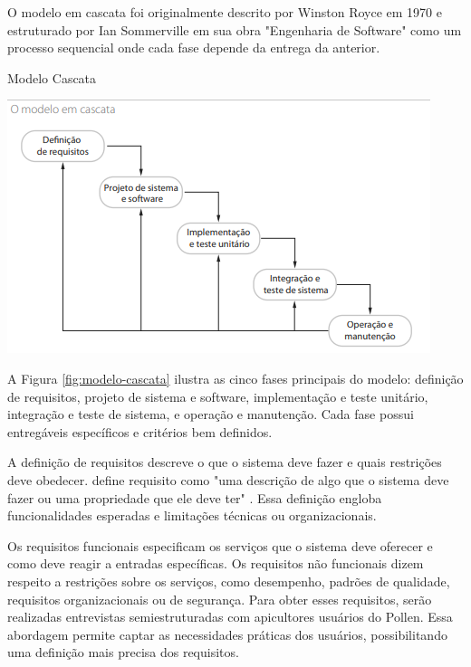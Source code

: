 \label{ssec:planejamento-desenvolvimento-solucao}

O modelo em cascata foi originalmente descrito por Winston Royce em 1970 e estruturado por Ian Sommerville em sua obra "Engenharia de Software" como um processo sequencial onde cada fase depende da entrega da anterior.

\begin{figura}{Modelo Cascata}{\textcite{sommerville2011}}
    \begin{flushleft}
        \label{fig:modelo-cascata}
        \includegraphics[width=0.95\linewidth]{resources/floats/ilustracoes/cascata.png}
    \end{flushleft}
\end{figura}

A Figura \ref{fig:modelo-cascata} ilustra as cinco fases principais do modelo: definição de requisitos, projeto de sistema e software, implementação e teste unitário, integração e teste de sistema, e operação e manutenção. Cada fase possui entregáveis específicos e critérios bem definidos.

\label{sssec:def-requisitos}

A definição de requisitos descreve o que o sistema deve fazer e quais restrições deve obedecer. \textcite{sommerville2011} define requisito como "uma descrição de algo que o sistema deve fazer ou uma propriedade que ele deve ter" \cite[p. 82]{sommerville2011}. Essa definição engloba funcionalidades esperadas e limitações técnicas ou organizacionais.

Os requisitos funcionais especificam os serviços que o sistema deve oferecer e como deve reagir a entradas específicas. Os requisitos não funcionais dizem respeito a restrições sobre os serviços, como desempenho, padrões de qualidade, requisitos organizacionais ou de segurança. Para obter esses requisitos, serão realizadas entrevistas semiestruturadas com apicultores usuários do Pollen. Essa abordagem permite captar as necessidades práticas dos usuários, possibilitando uma definição mais precisa dos requisitos.

